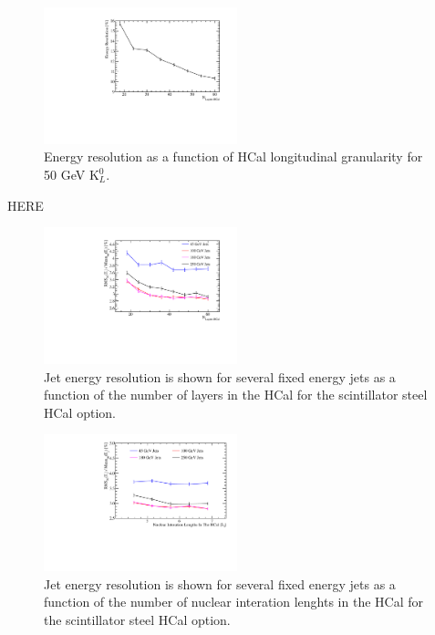 \begin{figure}
\centering
\includegraphics[width=0.5\textwidth]{OptimisationStudies/Plots/EnergyResolution/ER_vs_HCalLayerNumber_50GeVKaon0L.pdf}
\caption[Energy resolution as a function of HCal longitudinal granularity for 50 GeV $\text{K}^{0}_{L}$.]{Energy resolution as a function of HCal longitudinal granularity for 50 GeV $\text{K}^{0}_{L}$.}
\label{fig:hcalnlayers}
\end{figure}

HERE




\iffalse
\label{optstud:sec:hcal:nlayers}

\begin{figure}
  \includegraphics[width=0.5\textwidth]{OptimisationStudies/Plots/JetEnergyResolutions/JER_vs_NumberOfLayersInTheHCal.pdf}
  \caption[Jet energy resolution as a function of the number of layers in the HCal for the scintillator steel HCal option.]{Jet energy resolution is shown for several fixed energy jets as a function of the number of layers in the HCal for the scintillator steel HCal option.}
  \label{optstud:fig:hcalnlayers}
\end{figure}

\begin{figure}
  \includegraphics[width=0.5\textwidth]{OptimisationStudies/Plots/JetEnergyResolutions/JER_vs_NumberOfNuclearInterationLengthsInTheHCal.pdf}
  \caption[Jet energy resolution as a function of the number of nuclear interaction lengths in the HCal for the scintillator steel HCal option.]{Jet energy resolution is shown for several fixed energy jets as a function of the number of nuclear interation lenghts in the HCal for the scintillator steel HCal option.}
  \label{optstud:fig:hcaldepth}
\end{figure}

